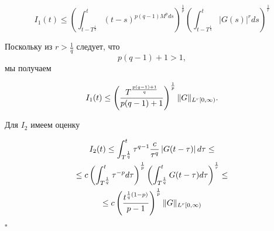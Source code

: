 \begin{equation*}
    I_1(t) \leq \left( \int_{t-T^{\frac{1}{q}}}^t (t-s)^{p(q-1)M^p ds} \right)^{\frac{1}{p}}
    \left( \int_{t-T^{\frac{1}{q}}}^t \left|G(s)\right|^r ds \right)^{\frac{1}{r}}
\end{equation*}

\noindent Поскольку из $r > \frac{1}{q}$ следует, что
$$p(q-1) + 1 > 1,$$
мы получаем

\begin{equation*}
    I_1(t) \leq \left( \frac{T^{\frac{p(q-1)+1}{q}}}{p(q-1)+1} \right)^{\frac{1}{p}} \lVert G\rVert_{L^r [0, \infty)}.
\end{equation*}

\noindent Для $I_2$ имеем оценку

\begin{equation*}
    \begin{gathered}
        I_2(t) \leq \int_{T^{\frac{1}{q}}}^t \tau^{q-1} \frac{c}{\tau^q} \left| G(t- \tau) \right| d\tau \leq \\
        \leq c \left( \int_{T^{\frac{1}{q}}}^t \tau^{-p} d\tau \right)^{\frac{1}{p}}
        \left( \int_{T^{\frac{1}{q}}}^{t} G(t - \tau) d\tau \right)^{\frac{1}{r}} \leq \\
        \leq c \left( \frac{t^{\frac{1}{q}(1-p)}}{p-1} \right)^{\frac{1}{p}} \lVert G\rVert_{L^r[0, \infty)}
    \end{gathered}
\end{equation*}

\begin{flushright}
$\square$
\end{flushright}

\clearpage


\nocite{*}

\printbibliography{}
